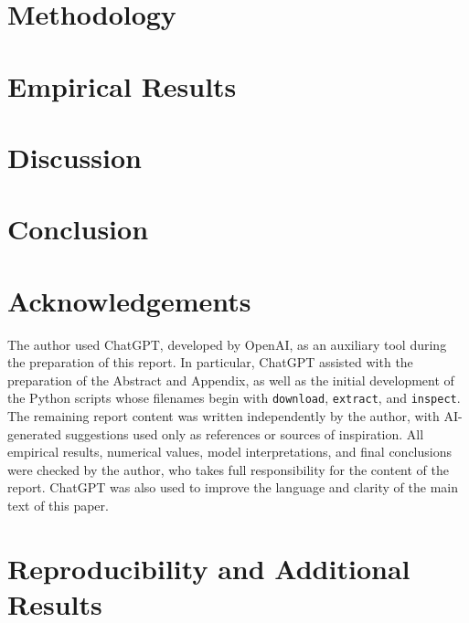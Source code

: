 \documentclass[11pt,a4paper]{article}
\begin{document}
\section{Methodology}
\label{sec:methodology}


\section{Empirical Results}
\label{sec:results}


\section{Discussion}
\label{sec:discussion}


\section{Conclusion}
\label{sec:conclusion}



\clearpage
\section*{Acknowledgements}

The author used ChatGPT, developed by OpenAI, as an auxiliary
tool during the preparation of this report. In particular,
ChatGPT assisted with the preparation of the Abstract and
Appendix, as well as the initial development of the Python
scripts whose filenames begin with \texttt{download},
\texttt{extract}, and \texttt{inspect}. The remaining report
content was written independently by the author, with
AI-generated suggestions used only as references or sources of
inspiration. All empirical results, numerical values, model
interpretations, and final conclusions were checked by the
author, who takes full responsibility for the content of the
report. ChatGPT was also used to improve the language and clarity of the main text of this paper.


\clearpage
{}





\clearpage
\appendix

\section{Reproducibility and Additional Results}
\label{sec:appendix}

\end{document}
